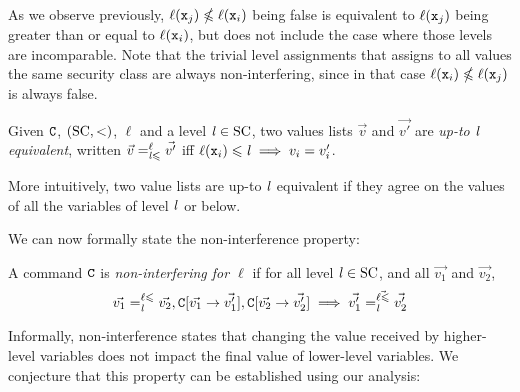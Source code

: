 \documentclass[conference]{IEEEtran}
\begin{document}
As we observe previously, \(\ell(\mathtt{x}_j) \nleqslant \ell(\mathtt{x}_i)\) being false is equivalent to \(\ell(\mathtt{x}_j)\) being greater than or equal to \(\ell(\mathtt{x}_i)\), but does not include the case where those levels are incomparable.
Note that the trivial level assignments that assigns to all values the same security class are always non-interfering, since in that case \(\ell(\mathtt{x}_i) \nleqslant \ell(\mathtt{x}_j)\) is always false.


\begin{definition}[Up-to %
	equivalence%
	]
	Given \(\mathtt{C}\), \((\mathrm{SC}, <)\), \(\ell\) and a level \(\mathit{l} \in \mathrm{SC}\), two values lists \(\vec{v}\) and \(\vec{v'}\) are \emph{up-to \(\mathit{l}\) equivalent}, written \(\vec{v}=^{\ell}_{\mathit{l} \leqslant} \vec{v'}\) iff
	\(
	\ell(\comm{x}_i) \leqslant \scl{l} \implies v_i=v'_i%
	\).
\end{definition}

More intuitively, two value lists are up-to %
\(\mathit{l}\) equivalent if they agree on the values of all the variables of level \(\mathit{l}\) or below. %

We can now formally state the non-interference property:

\begin{definition}
	\label{def:com-ni}
	A command \(\mathtt{C}\) is \emph{non-interfering for \(\ell\)} if for all level \(\mathit{l} \in \mathrm{SC}\), and all %
	 \(\vec{v_1}\) and \(\vec{v_2}\), 
	\[
	\vec{v_1}=^{\ell \leqslant}_{\mathit{l}} \vec{v_2}, \mathtt{C}[\vec{v_1} \rightarrow \vec{v_1'}], \mathtt{C}[\vec{v_2} \rightarrow \vec{v_2'}] \implies  \vec{v_1'}=^{\vec{\ell \leqslant}}_{\mathit{l}} \vec{v_2'}
	\]
\end{definition}

Informally, non-interference states that changing the value received by higher-level variables does not impact the final value of lower-level variables.
We conjecture that this property can be established using our analysis:
\end{document}
